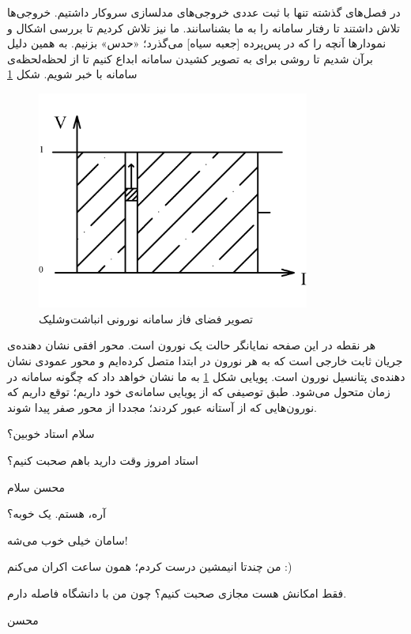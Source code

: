 	\label{chap:animations}
در فصل‌های گذشته تنها با ثبت عددی خروجی‌های مدلسازی سروکار داشتیم. خروجی‌ها تلاش داشتند تا رفتار سامانه را به ما بشناسانند. ما نیز تلاش کردیم تا بررسی اشکال و نمودارها آنچه را که در پس‌پرده [جعبه سیاه] می‌گذرد؛ «حدس» بزنیم. به همین دلیل برآن شدیم تا روشی برای به تصویر کشیدن سامانه ابداع کنیم تا از لحظه‌لحظه‌ی سامانه با خبر شویم. شکل \ref{fig:if_animation_plot}

\begin{figure}[!h]
	\centering
	\includegraphics[width =0.8\textwidth]{../papers_studies/figs/IF/IF_phase_space-Model.png}
	\caption{تصویر فضای فاز سامانه نورونی انباشت‌وشلیک}
	\label{fig:if_animation_plot}
\end{figure}

هر نقطه در این صفحه نمایانگر حالت یک نورون است. محور افقی نشان دهنده‌ی جریان ثابت خارجی است که به هر نورون در ابتدا متصل کرده‌ایم و محور عمودی نشان دهنده‌ی پتانسیل نورون است. پویایی شکل \ref{fig:if_animation_plot} به ما نشان خواهد داد که چگونه سامانه در زمان متحول می‌شود. طبق توصیفی که از پویایی سامانه‌ی خود داریم؛ توقع داریم که نورون‌هایی که از آستانه عبور کردند؛ مجددا از محور صفر پیدا شوند.\\

\begin{mohsenletter}
	سلام استاد خوبین؟
	
	استاد امروز وقت دارید باهم صحبت کنیم؟
	
	محسن
	\medskip
	سلام
	
	آره، هستم. یک خوبه؟
	
	سامان
	خیلی خوب می‌شه!
	
	من چندتا انیمشین درست کردم؛ همون ساعت اکران می‌کنم :)
	
	فقط امکانش هست مجازی صحبت کنیم؟ چون من با دانشگاه فاصله دارم.
	
	محسن
\end{mohsenletter}


